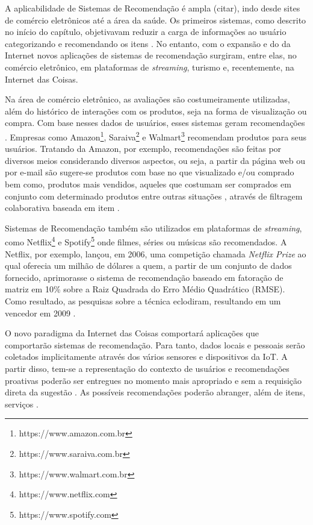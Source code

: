 
A aplicabilidade de Sistemas de Recomendação é ampla (citar), indo desde sites de comércio eletrônicos até a área da saúde. Os primeiros sistemas, como descrito no início do capítulo, objetivavam reduzir a carga de informações ao usuário categorizando e recomendando os itens \cite{Goldberg1992, Resnick1994}. No entanto, com o expansão e do da Internet novos aplicações de sistemas de recomendação surgiram, entre elas, no comércio eletrônico, em plataformas de \textit{streaming}, turismo e, recentemente, na Internet das Coisas. 

Na área de comércio eletrônico, as avaliações são costumeiramente utilizadas, além do histórico de interações com os produtos, seja na forma de visualização ou compra. Com base nesses dados de usuários, esses sistemas geram recomendações  \cite{Lu2015}. Empresas como Amazon\textsuperscript{\textregistered}\footnote{https://www.amazon.com.br}, Saraiva\textsuperscript{\textregistered}\footnote{https://www.saraiva.com.br} e Walmart\textsuperscript{\textregistered}\footnote{https://www.walmart.com.br} recomendam produtos para seus usuários. Tratando da Amazon, por exemplo, recomendações são feitas por diversos meios considerando diversos aspectos, ou seja, a partir da página web ou por e-mail são sugere-se produtos com base no que visualizado e/ou comprado bem como, produtos mais vendidos, aqueles que costumam ser comprados em conjunto com determinado produtos entre outras situações \cite{Krawiec2016}, através de filtragem colaborativa baseada em item \cite{Smith2017}.


Sistemas de Recomendação também são utilizados em plataformas de \textit{streaming}, como Netflix\textsuperscript{\textregistered}\footnote{https://www.netflix.com} e Spotify\textsuperscript{\textregistered}\footnote{https://www.spotify.com} onde filmes, séries ou músicas são recomendados. A Netflix, por exemplo, lançou, em 2006, uma competição chamada \textit{Netflix Prize} ao qual oferecia um milhão de dólares a quem, a partir de um conjunto de dados fornecido, aprimorasse o sistema de recomendação baseado em fatoração de matriz em 10\% sobre a Raiz Quadrada do Erro Médio Quadrático (RMSE). Como resultado, as pesquisas sobre a técnica eclodiram, resultando em um vencedor em 2009 \cite{Jannach2016}.


O novo paradigma da Internet das Coisas comportará aplicações que comportarão  sistemas de recomendação. Para tanto, dados locais e pessoais serão coletados implicitamente através dos vários sensores e dispositivos da IoT. A partir disso, tem-se a representação do contexto de usuários e recomendações proativas poderão ser entregues no momento mais apropriado e sem a requisição direta da sugestão \cite{Salman2015}. As possíveis recomendações poderão abranger, além de itens, serviços \cite {Mashal2015}.


